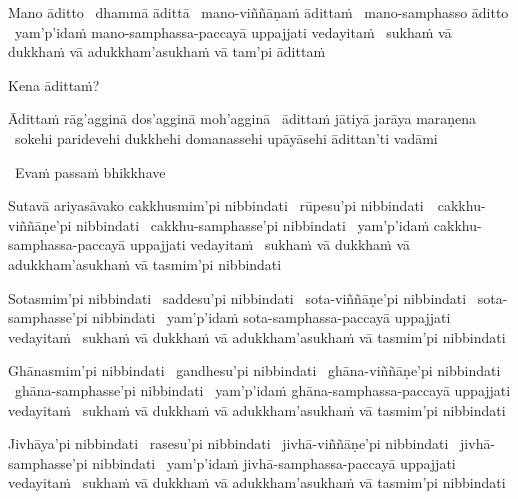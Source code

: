 \begin{pali-hang}
  Mano āditto \breathmark\ dhammā ādittā \breathmark\ mano-viññāṇaṁ ādittaṁ \breathmark\ mano-samphasso āditto \breathmark\ yam'p'idaṁ mano-samphassa-paccayā uppajjati vedayitaṁ \breathmark\ sukhaṁ vā dukkhaṁ vā adukkham'asukhaṁ vā tam'pi ādittaṁ
\end{pali-hang}
\begin{pali-hang-together}
  Kena ādittaṁ?
\end{pali-hang-together}
\ifbfiveversion\clearpage\fi
\begin{pali-hang-together}
  Ādittaṁ rāg'agginā dos'agginā moh'agginā \breathmark\ ādittaṁ jātiyā jarāya maraṇena \breathmark\ sokehi paridevehi dukkhehi domanassehi upāyāsehi ādittan'ti vadāmi
\end{pali-hang-together}

\begin{leader-pali}
  \anglebracketleft\ \hspace{-0.5mm}Evaṁ passaṁ bhikkhave \hspace{-0.5mm}\anglebracketright\
\end{leader-pali}
\begin{pali-hang-together}
  Sutavā ariyasāvako cakkhusmim'pi nibbindati \breathmark\ rūpesu'pi nibbindati~\breathmark\ cakkhu-viññāṇe'pi nibbindati \breathmark\ cakkhu-samphasse'pi nibbindati \breathmark\ yam'p'idaṁ cakkhu-samphassa-paccayā uppajjati vedayitaṁ \breathmark\ sukhaṁ vā dukkhaṁ vā adukkham'asukhaṁ vā tasmim'pi nibbindati
\end{pali-hang-together}

\begin{pali-hang}
  Sotasmim'pi nibbindati \breathmark\ saddesu'pi nibbindati \breathmark\ sota-viññāṇe'pi nibbindati \breathmark\ sota-samphasse'pi nibbindati \breathmark\ yam'p'idaṁ sota-samphassa-paccayā uppajjati vedayitaṁ \breathmark\ sukhaṁ vā dukkhaṁ vā adukkham'asukhaṁ vā tasmim'pi nibbindati
\end{pali-hang}

\begin{pali-hang}
  Ghānasmim'pi nibbindati \breathmark\ gandhesu'pi nibbindati \breathmark\ ghāna-viññāṇe'pi nibbindati \breathmark\ ghāna-samphasse'pi nibbindati \breathmark\ yam'p'idaṁ ghāna-samphassa-paccayā uppajjati vedayitaṁ \breathmark\ sukhaṁ vā dukkhaṁ vā adukkham'asukhaṁ vā tasmim'pi nibbindati
\end{pali-hang}

\begin{pali-hang}
  Jivhāya'pi nibbindati \breathmark\ rasesu'pi nibbindati \breathmark\ jivhā-viññāṇe'pi nibbindati \breathmark\ jivhā-samphasse'pi nibbindati \breathmark\ yam'p'idaṁ jivhā-samphassa-paccayā uppajjati vedayitaṁ \breathmark\ sukhaṁ vā dukkhaṁ vā adukkham'asukhaṁ vā tasmim'pi nibbindati
\end{pali-hang}

